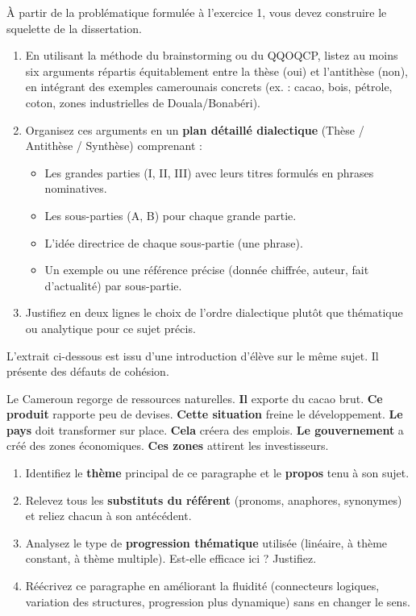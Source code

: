 \documentclass[11pt]{article}
\begin{document}
\begin{exercice}
À partir de la problématique formulée à l'exercice 1, vous devez construire le squelette de la dissertation.

\begin{enumerate}
    \item En utilisant la méthode du \og{}brainstorming\fg{} ou du \og{}QQOQCP\fg{}, listez au moins six arguments répartis équitablement entre la thèse (oui) et l'antithèse (non), en intégrant des exemples camerounais concrets (ex. : cacao, bois, pétrole, coton, zones industrielles de Douala/Bonabéri).
    \item Organisez ces arguments en un \textbf{plan détaillé dialectique} (Thèse / Antithèse / Synthèse) comprenant :
    \begin{itemize}
        \item Les grandes parties (I, II, III) avec leurs titres formulés en phrases nominatives.
        \item Les sous-parties (A, B) pour chaque grande partie.
        \item L'idée directrice de chaque sous-partie (une phrase).
        \item Un exemple ou une référence précise (donnée chiffrée, auteur, fait d'actualité) par sous-partie.
    \end{itemize}
    \item Justifiez en deux lignes le choix de l'ordre dialectique plutôt que thématique ou analytique pour ce sujet précis.
\end{enumerate}
\end{exercice}

\begin{exercice}
L'extrait ci-dessous est issu d'une introduction d'élève sur le même sujet. Il présente des défauts de cohésion.

\og{} Le Cameroun regorge de ressources naturelles. \textbf{Il} exporte du cacao brut. \textbf{Ce produit} rapporte peu de devises. \textbf{Cette situation} freine le développement. \textbf{Le pays} doit transformer sur place. \textbf{Cela} créera des emplois. \textbf{Le gouvernement} a créé des zones économiques. \textbf{Ces zones} attirent les investisseurs. \fg{}

\begin{enumerate}
    \item Identifiez le \textbf{thème} principal de ce paragraphe et le \textbf{propos} tenu à son sujet.
    \item Relevez tous les \textbf{substituts du référent} (pronoms, anaphores, synonymes) et reliez chacun à son antécédent.
    \item Analysez le type de \textbf{progression thématique} utilisée (linéaire, à thème constant, à thème multiple). Est-elle efficace ici ? Justifiez.
    \item Réécrivez ce paragraphe en améliorant la fluidité (connecteurs logiques, variation des structures, progression plus dynamique) sans en changer le sens.
\end{enumerate}
\end{exercice}
\end{document}
